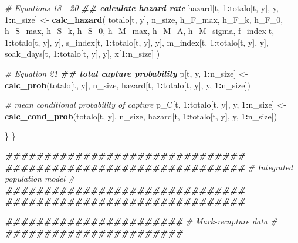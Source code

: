 \documentclass[
]{article}
\newenvironment{Shaded}{\begin{snugshade}}{\end{snugshade}}
\newcommand{\CommentTok}[1]{\textcolor[rgb]{0.56,0.35,0.01}{\textit{#1}}}
\newcommand{\DecValTok}[1]{\textcolor[rgb]{0.00,0.00,0.81}{#1}}
\newcommand{\DocumentationTok}[1]{\textcolor[rgb]{0.56,0.35,0.01}{\textbf{\textit{#1}}}}
\newcommand{\FunctionTok}[1]{\textcolor[rgb]{0.13,0.29,0.53}{\textbf{#1}}}
\newcommand{\NormalTok}[1]{#1}
\newcommand{\OtherTok}[1]{\textcolor[rgb]{0.56,0.35,0.01}{#1}}
\newcommand{\SpecialCharTok}[1]{\textcolor[rgb]{0.81,0.36,0.00}{\textbf{#1}}}
\begin{document}
\begin{Shaded}
\begin{Highlighting}[]
      \CommentTok{\# Equations 18 {-} 20}
      \DocumentationTok{\#\# calculate hazard rate}
\NormalTok{      hazard[t, }\DecValTok{1}\SpecialCharTok{:}\NormalTok{totalo[t, y], y, }\DecValTok{1}\SpecialCharTok{:}\NormalTok{n\_size] }\OtherTok{\textless{}{-}} \FunctionTok{calc\_hazard}\NormalTok{(}
\NormalTok{        totalo[t, y], n\_size, h\_F\_max, h\_F\_k, h\_F\_0, h\_S\_max, h\_S\_k, h\_S\_0,}
\NormalTok{        h\_M\_max, h\_M\_A, h\_M\_sigma, f\_index[t, }\DecValTok{1}\SpecialCharTok{:}\NormalTok{totalo[t, y], y],}
\NormalTok{        s\_index[t, }\DecValTok{1}\SpecialCharTok{:}\NormalTok{totalo[t, y], y], m\_index[t, }\DecValTok{1}\SpecialCharTok{:}\NormalTok{totalo[t, y], y],}
\NormalTok{        soak\_days[t, }\DecValTok{1}\SpecialCharTok{:}\NormalTok{totalo[t, y], y], x[}\DecValTok{1}\SpecialCharTok{:}\NormalTok{n\_size]}
\NormalTok{      )}

      \CommentTok{\# Equation 21}
      \DocumentationTok{\#\# total capture probability}
\NormalTok{      p[t, y, }\DecValTok{1}\SpecialCharTok{:}\NormalTok{n\_size] }\OtherTok{\textless{}{-}} \FunctionTok{calc\_prob}\NormalTok{(totalo[t, y], n\_size,}
\NormalTok{                                     hazard[t, }\DecValTok{1}\SpecialCharTok{:}\NormalTok{totalo[t, y], y, }\DecValTok{1}\SpecialCharTok{:}\NormalTok{n\_size])}

      \CommentTok{\# mean conditional probability of capture}
\NormalTok{      p\_C[t, }\DecValTok{1}\SpecialCharTok{:}\NormalTok{totalo[t, y],}
\NormalTok{          y, }\DecValTok{1}\SpecialCharTok{:}\NormalTok{n\_size] }\OtherTok{\textless{}{-}} \FunctionTok{calc\_cond\_prob}\NormalTok{(totalo[t, y], n\_size,}
\NormalTok{                                         hazard[t, }\DecValTok{1}\SpecialCharTok{:}\NormalTok{totalo[t, y],}
\NormalTok{                                                y, }\DecValTok{1}\SpecialCharTok{:}\NormalTok{n\_size])}

\NormalTok{    \}}
\NormalTok{  \}}

  \DocumentationTok{\#\#\#\#\#\#\#\#\#\#\#\#\#\#\#\#\#\#\#\#\#\#\#\#\#\#\#\#\#\#\#}
  \DocumentationTok{\#\#\#\#\#\#\#\#\#\#\#\#\#\#\#\#\#\#\#\#\#\#\#\#\#\#\#\#\#\#\#}
  \CommentTok{\# Integrated population model \#}
  \DocumentationTok{\#\#\#\#\#\#\#\#\#\#\#\#\#\#\#\#\#\#\#\#\#\#\#\#\#\#\#\#\#\#\#}
  \DocumentationTok{\#\#\#\#\#\#\#\#\#\#\#\#\#\#\#\#\#\#\#\#\#\#\#\#\#\#\#\#\#\#\#}

  \DocumentationTok{\#\#\#\#\#\#\#\#\#\#\#\#\#\#\#\#\#\#\#\#\#\#\#}
  \CommentTok{\# Mark{-}recapture data \#}
  \DocumentationTok{\#\#\#\#\#\#\#\#\#\#\#\#\#\#\#\#\#\#\#\#\#\#\#}


\end{Highlighting}
\end{Shaded}
\end{document}

